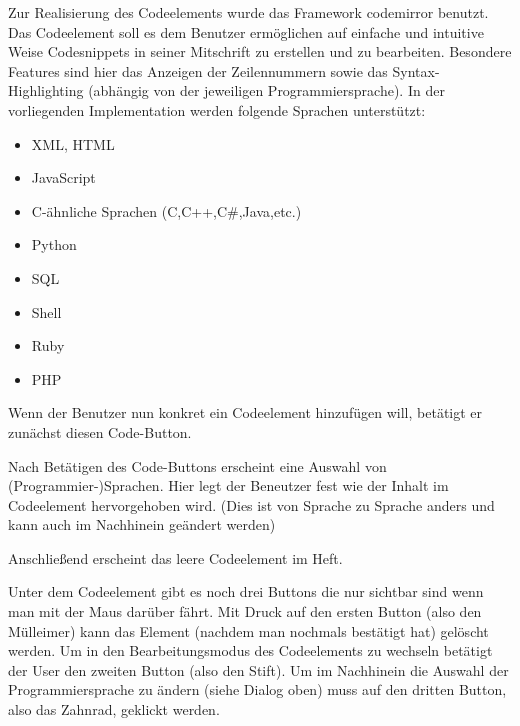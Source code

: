 
Zur Realisierung des Codeelements wurde das Framework codemirror \cite{CODEM} benutzt. Das Codeelement soll es dem Benutzer ermöglichen auf einfache und intuitive Weise Codesnippets in seiner Mitschrift zu erstellen und zu bearbeiten. Besondere Features sind hier das Anzeigen der Zeilennummern sowie das Syntax-Highlighting (abhängig von der jeweiligen Programmiersprache). In der vorliegenden Implementation werden folgende Sprachen unterstützt:
\begin{itemize}
\item XML, HTML
\item JavaScript
\item C-ähnliche Sprachen (C,C++,C\#,Java,etc.)
\item Python
\item SQL
\item Shell
\item Ruby
\item PHP
\end{itemize}

Wenn der Benutzer nun konkret ein Codeelement hinzufügen will, betätigt er zunächst diesen Code-Button.


\newpage

Nach Betätigen des Code-Buttons erscheint eine Auswahl von (Programmier-)Sprachen. Hier legt der Beneutzer fest wie der Inhalt im Codeelement hervorgehoben wird. (Dies ist von Sprache zu Sprache anders und kann auch im Nachhinein geändert werden)


Anschließend erscheint das leere Codeelement im Heft.


Unter dem Codeelement gibt es noch drei Buttons die nur sichtbar sind wenn man mit der Maus darüber fährt. Mit Druck auf den ersten Button (also den Mülleimer) kann das Element (nachdem man nochmals bestätigt hat) gelöscht werden. Um in den Bearbeitungsmodus des Codeelements zu wechseln betätigt der User den zweiten Button (also den Stift). Um im Nachhinein die Auswahl der Programmiersprache zu ändern (siehe Dialog oben) muss auf den dritten Button, also das Zahnrad, geklickt werden.

